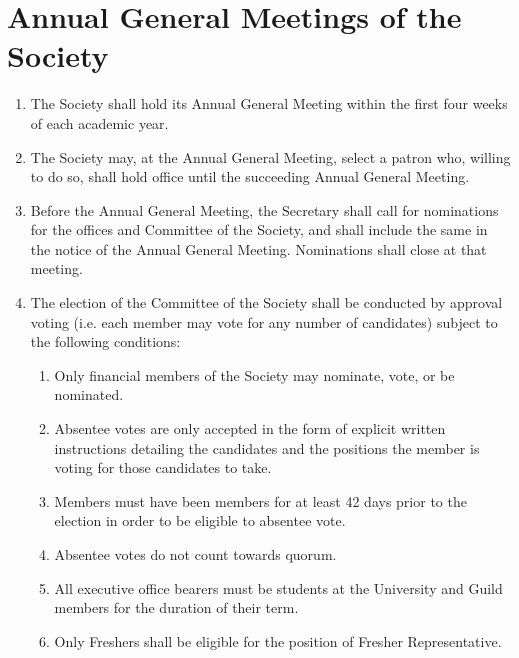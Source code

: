 \documentclass[a4paper]{article}
\begin{document}
\section{Annual General Meetings of the Society} \label{sec:AGMs}
\begin{enumerate}
    \item The Society shall hold its Annual General Meeting within the first four weeks of each academic year.
    \item The Society may, at the Annual General Meeting, select a patron who, willing to do so, shall hold office until the succeeding Annual General Meeting.
    \item Before the Annual General Meeting, the Secretary shall call for nominations for the offices and Committee of the Society, and shall include the same in the notice of the Annual General Meeting. Nominations shall close at that meeting.
    \item The election of the Committee of the Society shall be conducted by approval voting (i.e. each member may vote for any number of candidates) subject to the following conditions:
    \begin{enumerate}
        \item Only financial members of the Society may nominate, vote, or be nominated.
        \item Absentee votes are only accepted in the form of explicit written instructions detailing the candidates and the positions the member is voting for those candidates to take.
        \item Members must have been members for at least 42 days prior to the election in order to be eligible to absentee vote.
        \item Absentee votes do not count towards quorum.
        \item All executive office bearers must be students at the University and Guild members for the duration of their term.
        \item \label{fresher_rep_requirement} Only Freshers shall be eligible for the position of Fresher Representative.
    \end{enumerate}
\end{enumerate}
\end{document}
